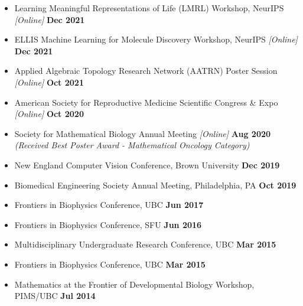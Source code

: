 \documentclass[margin,line]{res}
\begin{document}
\begin{resume}
{\begin{itemize}
\item[] Learning Meaningful Representations of Life (LMRL) Workshop, NeurIPS \textit{[Online]} \hfill {\bf \small  Dec 2021}
\item[] ELLIS Machine Learning for Molecule Discovery Workshop, NeurIPS \textit{[Online]} \hfill {\bf \small  Dec 2021}
\item[] Applied Algebraic Topology Research Network (AATRN) Poster Session \textit{[Online]} \hfill {\bf \small  Oct 2021}
\item[] American Society for Reproductive Medicine Scientific Congress \& Expo \textit{[Online]} \hfill {\bf \small  Oct 2020}
\item[] Society for Mathematical Biology Annual Meeting \textit{[Online]} \hfill {\bf \small  Aug 2020}\\ {\small \textit{(Received Best Poster Award - Mathematical Oncology Category)}}
\item[] New England Computer Vision Conference, Brown University \hfill {\bf \small  Dec 2019}
\item[] Biomedical Engineering Society Annual Meeting, Philadelphia, PA \hfill {\bf \small  Oct 2019}
\item[] Frontiers in Biophysics Conference, UBC \hfill {\bf \small  Jun 2017}
\item[] Frontiers in Biophysics Conference, SFU \hfill {\bf \small Jun 2016}
\item[] Multidisciplinary Undergraduate Research Conference, UBC \hfill {\bf \small Mar 2015}
\item[] Frontiers in Biophysics Conference, UBC \hfill {\bf \small Mar 2015}
\item[] Mathematics at the Frontier of Developmental Biology Workshop, PIMS/UBC \hfill {\bf \small Jul 2014}

\end{itemize}}
\end{resume}
\end{document}
